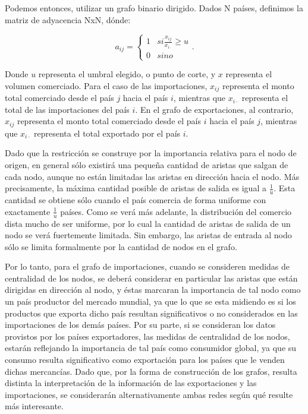 \documentclass[class=article, crop=false]{standalone}
\begin{document}
Podemos entonces, utilizar un grafo binario dirigido. Dados N países, definimos la matriz de adyacencia NxN, dónde:

$$
a_{ij} = 
 \begin{cases} 
      1 & si \frac{x_{ij}}{x_{i\cdot}}\geq u \\
      0 & sino 
  \end{cases}
  .
$$

Donde $u$ representa el umbral elegido, o punto de corte, y $x$ representa el volumen comerciado.   
Para el caso de las importaciones, $x_{ij}$ representa el monto total comerciado desde el país $j$ hacia el país $i$, mientras que $x_{i\cdot}$ representa el total de las importaciones del país $i$. En el grafo de exportaciones, al contrario, $x_{ij}$ representa el monto total comerciado desde el país $i$ hacia el país $j$, mientras que $x_{i\cdot}$ representa el total exportado por el país $i$.          

Dado que la restricción se construye por la importancia relativa para el nodo de origen, en general sólo existirá una pequeña cantidad de aristas que salgan de cada nodo, aunque no están limitadas las aristas en dirección hacia el nodo. Más precisamente, la máxima cantidad posible de aristas de salida es igual a $\frac{1}{u}$. Esta cantidad se obtiene sólo cuando el país comercia de forma uniforme con exactamente $\frac{1}{u}$ países. Como se verá más adelante, la distribución del comercio dista mucho de ser uniforme, por lo cual la cantidad de aristas de salida de un nodo se verá fuertemente limitada. Sin embargo, las aristas de entrada al nodo sólo se limita formalmente por la cantidad de nodos en el grafo. 

Por lo tanto, para el grafo de importaciones, cuando se consideren medidas de centralidad de los nodos, se deberá considerar en particular las aristas que están dirigidas en dirección al nodo, y éstas marcaran la importancia de tal nodo como un país productor del mercado mundial, ya que lo que se esta midiendo es si los productos que exporta dicho país resultan significativos o no considerados en las importaciones de los demás países. Por su parte, si se consideran los datos provistos por los países exportadores, las medidas de centralidad de los nodos, estarán reflejando la importancia de tal país como consumidor global, ya que su consumo resulta significativo como exportación para los países que le venden dichas mercancías. 
Dado que, por la forma de construcción de los grafos, resulta distinta la interpretación de la información de las exportaciones y las importaciones, se considerarán alternativamente ambas redes según qué resulte más interesante. 
\end{document}
